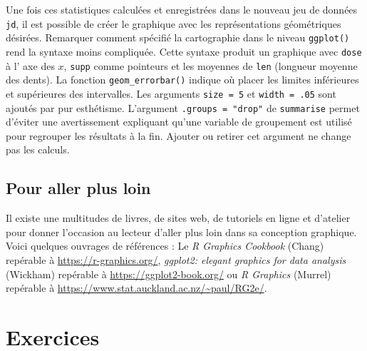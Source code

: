 \documentclass[
]{book}
\begin{document}
Une fois ces statistiques calculées et enregistrées dans le nouveau jeu de données \texttt{jd}, il est possible de créer le graphique avec les représentations géométriques désirées. Remarquer comment spécifié la cartographie dans le niveau \texttt{ggplot()} rend la syntaxe moins compliquée. Cette syntaxe produit un graphique avec \texttt{dose} à l' axe des \(x\), \texttt{supp} comme pointeurs et les moyennes de \texttt{len} (longueur moyenne des dents). La fonction \texttt{geom\_errorbar()} indique où placer les limites inférieures et supérieures des intervalles. Les arguments \texttt{size\ =\ 5} et \texttt{width\ =\ .05} sont ajoutés par pur esthétisme. L'argument \texttt{.groups\ =\ "drop"} de \texttt{summarise} permet d'éviter une avertissement expliquant qu'une variable de groupement est utilisé pour regrouper les résultats à la fin. Ajouter ou retirer cet argument ne change pas les calculs.

\hypertarget{pour-aller-plus-loin}{%
\section{Pour aller plus loin}\label{pour-aller-plus-loin}}

Il existe une multitudes de livres, de sites web, de tutoriels en ligne et d'atelier pour donner l'occasion au lecteur d'aller plus loin dans sa conception graphique. Voici quelques ouvrages de références : Le \emph{R Graphics Cookbook} (Chang) repérable à \url{https://r-graphics.org/}, \emph{ggplot2: elegant graphics for data analysis} (Wickham) repérable à \url{https://ggplot2-book.org/} ou \emph{R Graphics} (Murrel) repérable à \url{https://www.stat.auckland.ac.nz/~paul/RG2e/}.

\hypertarget{exercice-gestion}{%
\chapter*{Exercices}\label{exercice-gestion}}
\end{document}
